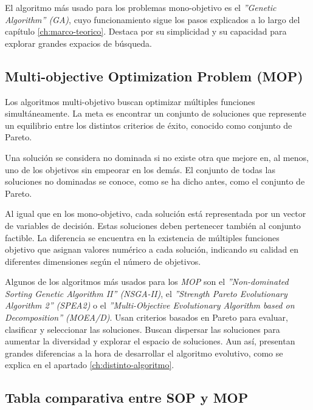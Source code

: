 El algoritmo más usado para los problemas mono-objetivo es el \textit{''Genetic Algorithm'' (GA)}, cuyo funcionamiento sigue los pasos explicados a lo largo del capítulo \ref{ch:marco-teorico}. Destaca por su simplicidad y su capacidad para explorar grandes expacios de búsqueda.

\subsection{Multi-objective Optimization Problem (MOP)}

Los algoritmos multi-objetivo buscan optimizar múltiples funciones simultáneamente. La meta es encontrar un conjunto de soluciones que represente un equilibrio entre los distintos criterios de éxito, conocido como conjunto de Pareto.

Una solución se considera no dominada si no existe otra que mejore en, al menos, uno de los objetivos sin empeorar en los demás. El conjunto de todas las soluciones no dominadas se conoce, como se ha dicho antes, como el conjunto de Pareto.

Al igual que en los mono-objetivo, cada solución está representada por un vector de variables de decisión. Estas soluciones deben pertenecer también al conjunto factible. La diferencia se encuentra en la existencia de múltiples funciones objetivo que asignan valores numérico a cada solución, indicando su calidad en diferentes dimensiones según el número de objetivos.

Algunos de los algoritmos más usados para los \textit{MOP} son el \textit{''Non-dominated Sorting Genetic Algorithm II'' (NSGA-II)}, el \textit{''Strength Pareto Evolutionary Algorithm 2'' (SPEA2)} o el \textit{''Multi-Objective Evolutionary Algorithm based on Decomposition'' (MOEA/D)}. Usan criterios basados en Pareto para evaluar, clasificar y seleccionar las soluciones. Buscan dispersar las soluciones para aumentar la diversidad y explorar el espacio de soluciones. Aun así, presentan grandes diferencias a la hora de desarrollar el algoritmo evolutivo, como se explica en el apartado \ref{ch:distinto-algoritmo}.

\subsection*{Tabla comparativa entre SOP y MOP}

